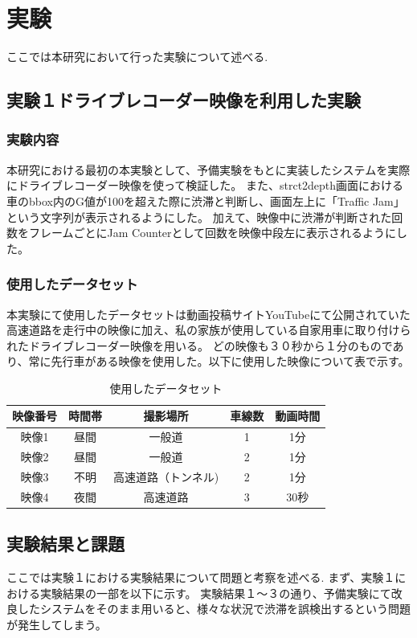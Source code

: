 \chapter{実験}
ここでは本研究において行った実験について述べる.

\section{実験１ドライブレコーダー映像を利用した実験}
\subsection{実験内容}
本研究における最初の本実験として、予備実験をもとに実装したシステムを実際にドライブレコーダー映像を使って検証した。
また、strct2depth画面における車のbbox内のG値が100を超えた際に渋滞と判断し、画面左上に「Traffic Jam」という文字列が表示されるようにした。
加えて、映像中に渋滞が判断された回数をフレームごとにJam Counterとして回数を映像中段左に表示されるようにした。

\subsection{使用したデータセット}
本実験にて使用したデータセットは動画投稿サイトYouTubeにて公開されていた高速道路を走行中の映像に加え、私の家族が使用している自家用車に取り付けられたドライブレコーダー映像を用いる。
どの映像も３０秒から１分のものであり、常に先行車がある映像を使用した。以下に使用した映像について表で示す。

\begin{table}[htbp]
  \centering
  \begin{scriptsize}
  \begin{tabular}{ccccc}
  \toprule
映像番号 & 時間帯 & 撮影場所 & 車線数 & 動画時間\\
  \midrule
映像1 & 昼間 & 一般道 & 1 & 1分\\
映像2 & 昼間 & 一般道 & 2 & 1分\\
映像3 & 不明 & 高速道路（トンネル) & 2 & 1分 \\
映像4 & 夜間 & 高速道路 & 3 & 30秒\\
  \bottomrule
  \end{tabular}
  \end{scriptsize}
  \caption{使用したデータセット}
  \label{tab:dataset}
\end{table}
\newpage
\section{実験結果と課題}
ここでは実験１における実験結果について問題と考察を述べる.
まず、実験１における実験結果の一部を以下に示す。
実験結果１〜３の通り、予備実験にて改良したシステムをそのまま用いると、様々な状況で渋滞を誤検出するという問題が発生してしまう。


